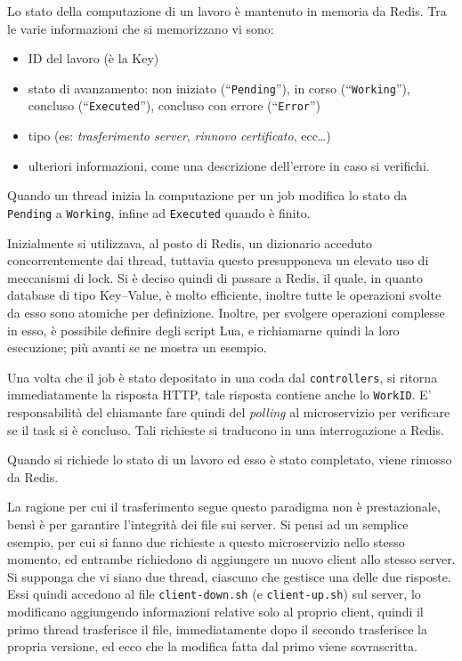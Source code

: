 Lo stato della computazione di un lavoro è mantenuto in memoria da Redis. Tra le varie informazioni
che si memorizzano vi sono:
\begin{itemize}
	\item ID del lavoro (è la Key)
	\item stato di avanzamento: non iniziato (``\texttt{Pending}''), in corso (``\texttt{Working}''),
	      concluso (``\texttt{Executed}''), concluso con errore (``\texttt{Error}'')
	\item tipo (es: \textit{trasferimento server}, \textit{rinnovo certificato}, ecc\ldots)
	\item ulteriori informazioni, come una descrizione dell'errore in caso si verifichi.
\end{itemize}

Quando un thread inizia la computazione per un job modifica lo stato da \texttt{Pending}
a \texttt{Working}, infine ad \texttt{Executed} quando è finito.

Inizialmente si utilizzava, al posto di Redis, un dizionario acceduto concorrentemente dai thread,
tuttavia questo presupponeva un elevato uso di meccanismi di lock. Si è deciso quindi di
passare a Redis, il quale, in quanto database di tipo Key--Value, è molto efficiente,
inoltre tutte le operazioni svolte da esso sono atomiche per definizione.
Inoltre, per svolgere operazioni complesse in esso, è possibile definire degli script Lua,
e richiamarne quindi la loro esecuzione; più avanti se ne mostra un esempio.

Una volta che il job è stato depositato in una coda dal \texttt{controllers}, si ritorna immediatamente
la risposta HTTP, tale risposta contiene anche lo \texttt{WorkID}. E' responsabilità
del chiamante fare quindi del \textit{polling} al microservizio per verificare se il task
si è concluso. Tali richieste si traducono in una interrogazione a Redis.

Quando si richiede lo stato di un lavoro ed esso è stato completato, viene rimosso da Redis.

La ragione per cui il trasferimento segue questo paradigma non è prestazionale, bensì è per
garantire l'integrità dei file sui server.
Si pensi ad un semplice esempio, per cui si fanno due richieste a questo microservizio nello stesso
momento, ed entrambe richiedono di aggiungere un nuovo client allo stesso server.
Si supponga che vi siano due thread, ciascuno che gestisce una delle due risposte. Essi quindi
accedono al file \texttt{client-down.sh} (e \texttt{client-up.sh}) sul server, lo modificano
aggiungendo informazioni
relative solo al proprio client, quindi il primo thread trasferisce il file, immediatamente dopo
il secondo trasferisce la propria versione, ed ecco che la modifica fatta dal primo viene
sovrascritta.

